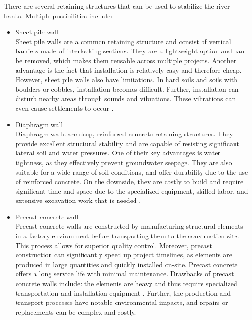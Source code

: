 There are several retaining structures that can be used to stabilize the river banks. Multiple possibilities include:
\begin{itemize}
    \item Sheet pile wall\\
    Sheet pile walls are a common retaining structure and consist of vertical barriers made of interlocking sections. They are a lightweight option and can be removed, which makes them reusable across multiple projects. Another advantage is the fact that installation is relatively easy and therefore cheap. However, sheet pile walls also have limitations. In hard soils and soils with boulders or cobbles, installation becomes difficult. Further, installation can disturb nearby areas through sounds and vibrations. These vibrations can even cause settlements to occur \autocite{korffReaderDeepExcavations2023}.

    \item Diaphragm wall\\
    Diaphragm walls are deep, reinforced concrete retaining structures. They provide excellent structural stability and are capable of resisting significant lateral soil and water pressures. One of their key advantages is water tightness, as they effectively prevent groundwater seepage. They are also suitable for a wide range of soil conditions, and offer durability due to the use of reinforced concrete. On the downside, they are costly to build and require significant time and space due to the specialized equipment, skilled labor, and extensive excavation work that is needed \autocite{korffReaderDeepExcavations2023}.
    
    \item Precast concrete wall\\
    Precast concrete walls are constructed by manufacturing structural elements in a factory environment before transporting them to the construction site. This process allows for superior quality control. Moreover, precast construction can significantly speed up project timelines, as elements are produced in large quantities and quickly installed on-site. Precast concrete offers a long service life with minimal maintenance. Drawbacks of precast concrete walls include: the elements are heavy and thus require specialized transportation and installation equipment \autocite{mcneilengineeringAdvantagesDisadvantagesUsing2023}. Further, the production and transport processes have notable environmental impacts, and repairs or replacements can be complex and costly.


\end{itemize}
